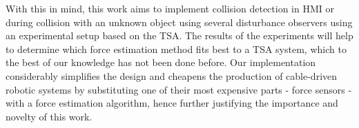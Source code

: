 With this in mind, this work aims to implement collision detection in HMI or during collision with an unknown object using several disturbance observers using an experimental setup based on the TSA. The results of the experiments will help to determine which force estimation method fits best to a TSA system, which to the best of our knowledge has not been done before. Our implementation considerably simplifies the design and cheapens the production of cable-driven robotic systems by substituting one of their most expensive parts - force sensors - with a force estimation algorithm, hence further justifying the importance and novelty of this work. \\